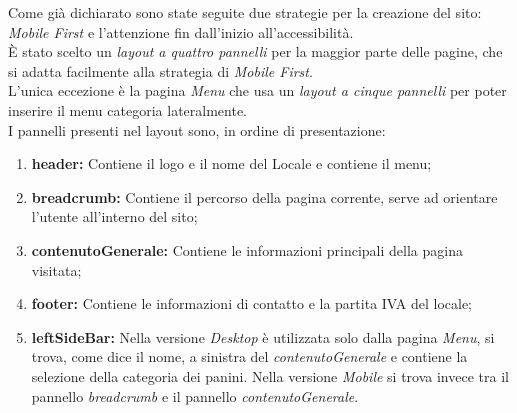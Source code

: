 Come già dichiarato sono state seguite due strategie per la creazione del sito: \emph{Mobile First} e l'attenzione fin dall'inizio all'accessibilità.\\
È stato scelto un \emph{layout a quattro pannelli} per la maggior parte delle pagine, che si adatta facilmente alla strategia di \emph{Mobile First}.\\
L'unica eccezione è la pagina \emph{Menu} che usa un \emph{layout a cinque pannelli} per poter inserire il menu categoria lateralmente.\\
I pannelli presenti nel layout sono, in ordine di presentazione:
\begin{enumerate}
	\item \textbf{header:} Contiene il logo e il nome del Locale e contiene il menu; 
	\item \textbf{breadcrumb:} Contiene il percorso della pagina corrente, serve ad orientare l'utente all'interno del sito;
	\item \textbf{contenutoGenerale:} Contiene le informazioni principali della pagina visitata;
	\item \textbf{footer:} Contiene le informazioni di contatto e la partita IVA del locale;
	\item \textbf{leftSideBar:} Nella versione \emph{Desktop} è utilizzata solo dalla pagina \emph{Menu}, si trova, come dice il nome, a sinistra del \emph{contenutoGenerale} e contiene la selezione della categoria dei panini. 
	Nella versione \emph{Mobile} si trova invece tra il pannello \emph{breadcrumb} e il pannello \emph{contenutoGenerale}.
\end{enumerate}